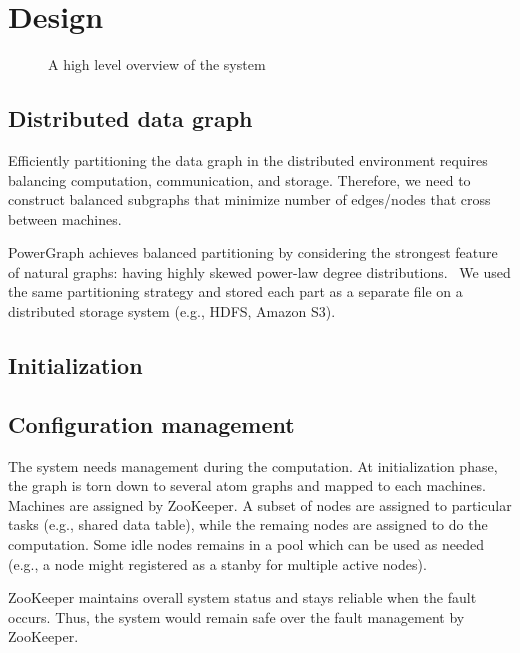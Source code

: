 
\section{Design}

\begin{figure*}
\centering
\caption{A high level overview of the system}
\label{fig:cdn}
\end{figure*}

\subsection{Distributed data graph}
Efficiently partitioning the data graph in the distributed environment requires balancing computation, communication, and storage. 
Therefore, we need to construct balanced subgraphs that minimize number of edges/nodes that cross between machines. 

PowerGraph achieves balanced partitioning by considering the strongest feature of natural graphs: having highly skewed power-law degree distributions.~\cite{powerGraph} 
We used the same partitioning strategy and stored each part as a separate file on a distributed storage system (e.g., HDFS, Amazon S3).

\subsection{Initialization} 

\subsection{Configuration management}
The system needs management during the computation. 
At initialization phase, the graph is torn down to several atom graphs and mapped to each machines. 
Machines are assigned by ZooKeeper. A subset of nodes are assigned to particular tasks (e.g., shared data table), while the remaing nodes are assigned to do the computation. 
Some idle nodes remains in a pool which can be used as needed (e.g., a node might registered as a stanby for multiple active nodes). 

ZooKeeper maintains overall system status and stays reliable when the fault occurs. Thus, the system would remain safe over the fault management by ZooKeeper.

